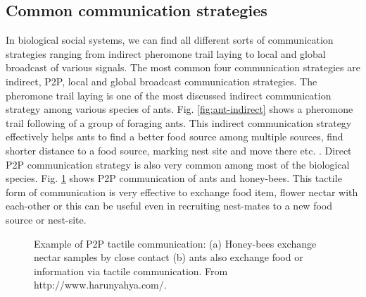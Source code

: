 \documentclass{intech}
\begin{document}
\subsection{Common communication strategies}
\label{bg:bio-comm:strategies}
In biological social systems, we can find all different sorts of communication strategies ranging from indirect pheromone trail laying to local and global broadcast of various signals. The most common four communication strategies are indirect, P2P, local and global broadcast communication strategies. The pheromone trail laying is one of the most discussed indirect communication strategy among various species of ants. Fig. \ref{fig:ant-indirect} shows a pheromone trail following of a group of foraging ants. This indirect communication strategy effectively helps ants to find a better food source among multiple sources, find shorter distance to a food source, marking nest site and move there etc. \citep{Hughes2008}. Direct P2P communication strategy is also very common among most of the biological species. Fig. \ref{fig:bees-ants-p2p-comm} shows P2P communication of ants and honey-bees. This tactile form of communication is very effective to exchange food item, flower nectar with each-other or this can be useful even in recruiting nest-mates to a new food source or nest-site.
\begin{figure}
\centering
{}
\caption{Example of P2P tactile communication: (a) Honey-bees exchange nectar samples by close contact (b) ants also exchange food or information via tactile communication. \protect\newline  From http://www.harunyahya.com/.} %
\label{fig:bees-ants-p2p-comm}
\end{figure}
\end{document}

